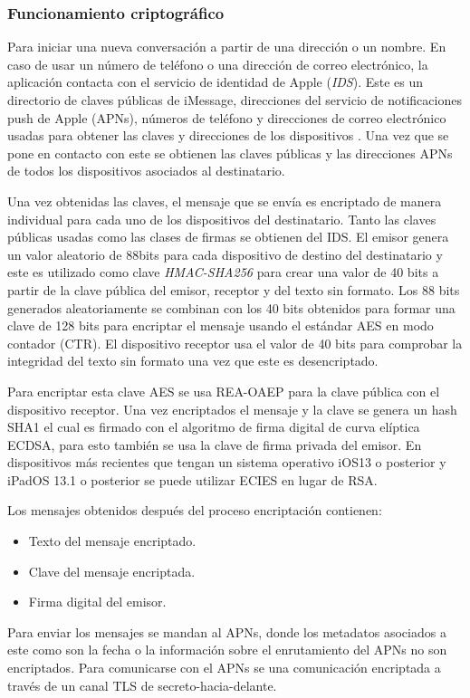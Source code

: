 \subsubsection{Funcionamiento criptográfico}
Para iniciar una nueva conversación a partir de una dirección o un nombre. En caso de usar un número de teléfono o una dirección de correo electrónico, la aplicación contacta con el servicio de identidad de Apple (\emph{IDS}). Este es un directorio de claves públicas de iMessage, direcciones del servicio de notificaciones push de Apple (APNs), números de teléfono y direcciones de correo electrónico usadas para obtener las claves y direcciones de los dispositivos \cite{ids}. Una vez que se pone en contacto con este se obtienen las claves públicas y las direcciones APNs de todos los dispositivos asociados al destinatario.

Una vez obtenidas las claves, el mensaje que se envía es encriptado de manera individual para cada uno de los dispositivos del destinatario. Tanto las claves públicas usadas como las clases de firmas se obtienen del IDS. El emisor genera un valor aleatorio de 88bits para cada dispositivo de destino del destinatario y este es utilizado como clave \emph{HMAC-SHA256} para crear una valor de 40 bits a partir de la clave pública del emisor, receptor y del texto sin formato. Los 88 bits generados aleatoriamente se combinan con los 40 bits obtenidos para formar una clave de 128 bits para encriptar el mensaje usando el estándar AES en modo contador (CTR).
El dispositivo receptor usa el valor de 40 bits para comprobar la integridad del texto sin formato una vez que este es desencriptado.

Para encriptar esta clave AES se usa REA-OAEP para la clave pública con el dispositivo receptor. Una vez encriptados el mensaje y la clave se genera un hash SHA1 el cual es firmado con el algoritmo de firma digital de curva elíptica ECDSA, para esto también se usa la clave de firma privada del emisor. En dispositivos más recientes que tengan un sistema operativo iOS13 o posterior y iPadOS 13.1 o posterior se puede utilizar ECIES en lugar de RSA.

Los mensajes obtenidos después del proceso encriptación contienen:
\begin{itemize}
	\item Texto del mensaje encriptado.
	\item Clave del mensaje encriptada.
	\item Firma digital del emisor.
\end{itemize}
Para enviar los mensajes se mandan al APNs, donde los metadatos asociados a este como son la fecha o la información sobre el enrutamiento del APNs no son encriptados. Para comunicarse con el APNs se una comunicación encriptada a través de un canal TLS de secreto-hacia-delante.

